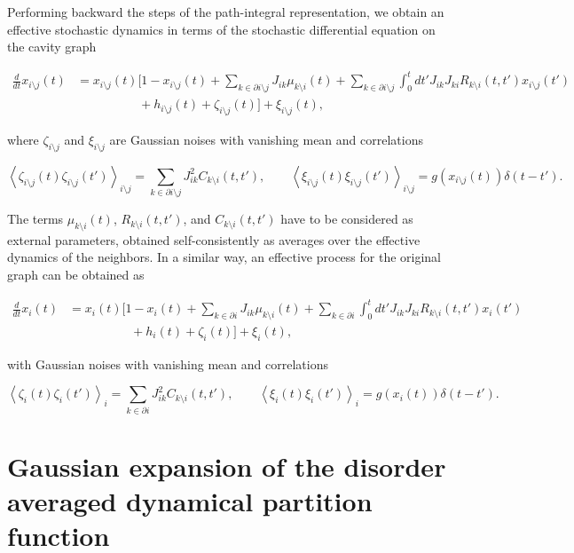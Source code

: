 \documentclass[
    preprint,
    linenumbers,
    amsmath,amssymb,amsfonts,
    aps, physrev,
    superscriptaddress,
    10pt,
    bibnotes
    ]{revtex4-2}
\begin{document}
Performing backward the steps of the path-integral representation, we obtain an effective stochastic dynamics in terms of the stochastic differential equation on the cavity graph

\begin{align}
\frac{d}{dt}x_{i\setminus j}(t) & =x_{i\setminus j}(t)\Biggl[1-x_{i\setminus j}(t)+\sum_{k\in\partial i\setminus j}J_{ik}\mu_{k\setminus i}(t) + \sum_{k\in\partial i\setminus j}\int_{0}^{t}dt'J_{ik}J_{ki}R_{k\setminus i}(t,t')x_{i\setminus j}(t') \nonumber \\
 & \qquad\quad \qquad +h_{i\setminus j}(t)+\zeta_{i\setminus j}(t)\Biggr]+\xi_{i\setminus j}(t),
\end{align}

where $\zeta_{i\setminus j}$ and $\xi_{i\setminus j}$ are Gaussian noises with vanishing mean and correlations

\begin{equation}
\left\langle \zeta_{i\setminus j}(t)\zeta_{i\setminus j}(t')\right\rangle _{i\setminus j}=\sum_{k\in\partial i\setminus j}J_{ik}^{2}C_{k\setminus i}(t,t'),\qquad\left\langle \xi_{i\setminus j}(t)\xi_{i\setminus j}(t')\right\rangle _{i\setminus j}=g(x_{i\setminus j}(t))\delta(t-t').
\end{equation}

The terms $\mu_{k\setminus i}(t)$, $R_{k\setminus i}(t,t')$, and $C_{k\setminus i}(t,t')$ have to be considered as external parameters, obtained self-consistently as averages over the effective dynamics of the neighbors. In a similar way, an effective process for the original graph can be obtained as

\begin{align}
  \frac{d}{dt}x_{i}(t) & =x_{i}(t)\Biggl[1-x_{i}(t)+\sum_{k\in\partial i}J_{ik}\mu_{k\setminus i}(t) + \sum_{k\in\partial i}\int_{0}^{t}dt'J_{ik}J_{ki}R_{k\setminus i}(t,t')x_{i}(t') \nonumber \\
   & \qquad\quad \qquad +h_{i}(t)+\zeta_{i}(t)\Biggr]+\xi_{i}(t),
\end{align}

with Gaussian noises with vanishing mean and correlations

\begin{equation}
  \left\langle \zeta_{i}(t)\zeta_{i}(t')\right\rangle _{i}=\sum_{k\in\partial i}J_{ik}^{2}C_{k\setminus i}(t,t'),\qquad\left\langle \xi_{i}(t)\xi_{i}(t')\right\rangle _{i}=g(x_{i}(t))\delta(t-t').
\end{equation}


\section{Gaussian expansion of the disorder averaged dynamical partition function} \label{app:naive_method}
\end{document}
